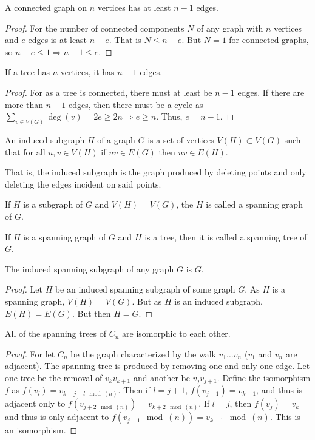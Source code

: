 \documentclass[crop=false,class=book,oneside]{standalone}
\begin{document}
\begin{corollary}
A connected graph on $n$ vertices has at least $n-1$ edges.
\end{corollary}
\begin{proof}
For the number of connected components $N$ of any graph with $n$ vertices and $e$ edges is at least $n-e$. That is $N\leq n-e$. But $N=1$ for connected graphs, so $n-e\leq 1 \Rightarrow n-1\leq e$.
\end{proof}
\begin{theorem}
If a tree has $n$ vertices, it has $n-1$ edges.
\end{theorem}
\begin{proof} For as a tree is connected, there must at least be $n-1$ edges. If there are more than $n-1$ edges, then there must be a cycle as $\sum_{v\in V(G)} \deg(v) = 2e \geq 2n\Rightarrow e\geq n$. Thus, $e=n-1$. 
\end{proof}
\begin{definition}
An induced subgraph $H$ of a graph $G$ is a set of vertices $V(H) \subset V(G)$ such that for all $u,v\in V(H)$ if $uv\in E(G)$ then $uv \in E(H)$.
\end{definition}
\begin{remark}
That is, the induced subgraph is the graph produced by deleting points and only deleting the edges incident on said points.
\end{remark}
\begin{definition}
If $H$ is a subgraph of $G$ and $V(H)=V(G)$, the $H$ is called a spanning graph of $G$.
\end{definition}
\begin{definition}
If $H$ is a spanning graph of $G$ and $H$ is a tree, then it is called a spanning tree of $G$.
\end{definition}
\begin{corollary}
The induced spanning subgraph of any graph $G$ is $G$.
\end{corollary}
\begin{proof}
Let $H$ be an induced spanning subgraph of some graph $G$. As $H$ is a spanning graph, $V(H)=V(G)$. But as $H$ is an induced subgraph, $E(H)=E(G)$. But then $H=G$.
\end{proof}
\begin{theorem}
All of the spanning trees of $C_n$ are isomorphic to each other.
\end{theorem}
\begin{proof}
For let $C_n$ be the graph characterized by the walk $v_1\hdots v_n$ ($v_1$ and $v_n$ are adjacent). The spanning tree is produced by removing one and only one edge. Let one tree be the removal of $v_{k}v_{k+1}$ and another be $v_{j}v_{j+1}$. Define the isomorphism $f$ as $f(v_l) = v_{k-j+l \mod(n)}$. Then if $l=j+1$, $f(v_{j+1}) = v_{k+1}$, and thus is adjacent only to $f(v_{j+2 \mod(n)}) = v_{k+2\mod(n)}$. If $l=j$, then $f(v_j) = v_k$ and thus is only adjacent to $f(v_{j-1}\mod(n)) = v_{k-1}\mod(n)$. This is an isomorphism.
\end{proof}
\end{document}
